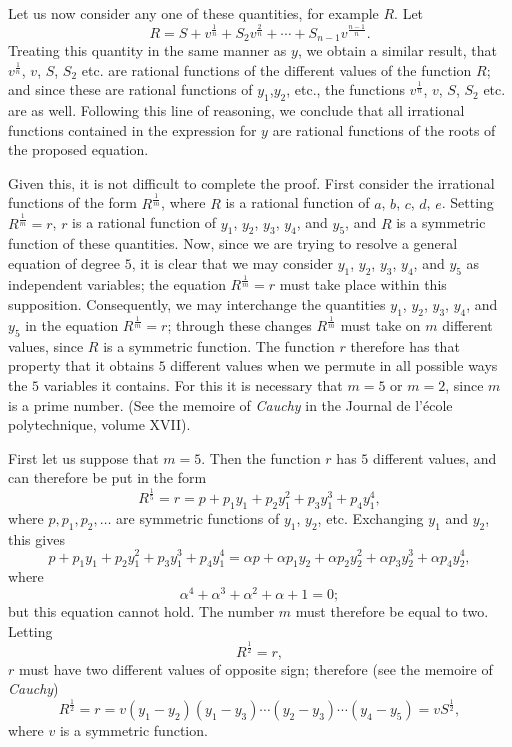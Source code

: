 \documentclass[12pt]{article}
\begin{document}
Let us now consider any one of these quantities, for example $R$.   Let
\[ R = S + v^{\frac{1}{n}} + S_2 v^{\frac{2}{n}} + \cdots + S_{n-1} v^{\frac{n-1}{n}}. \]
Treating this quantity in the same manner as $y$, we obtain a similar result, that $v^{ \frac{1}{n} }$, $v$, $S$, $S_2$ etc. are rational functions of the different values of the function $R$; and since these are rational functions of $y_1$,$y_2$, etc., the functions $v^{\frac{1}{n}}$, $v$, $S$, $S_2$ etc. are as well.  Following this line of reasoning, we conclude that all irrational functions contained in the expression for $y$ are rational functions of the roots of the proposed equation. 

Given this, it is not difficult to complete the proof.  First consider the irrational functions of the form $R^{\frac{1}{m}}$, where $R$ is a rational function of $a$, $b$, $c$, $d$, $e$.  Setting $R^{\frac{1}{m}} = r$, $r$ is a rational function of $y_1$, $y_2$, $y_3$, $y_4$, and $y_5$, and $R$ is a symmetric function of these quantities.  Now, since we are trying to resolve a general equation of degree $5$, it is clear that we may consider $y_1$, $y_2$, $y_3$, $y_4$, and $y_5$ as independent variables; the equation $R^{\frac{1}{m}} = r$ must take place within this supposition.  Consequently, we may interchange the quantities $y_1$, $y_2$, $y_3$, $y_4$, and $y_5$ in the equation $R^{\frac{1}{m}} = r$; through these changes $R^{\frac{1}{m}}$ must take on $m$ different values, since $R$ is a symmetric function.  The function $r$ therefore has that property that it obtains $5$ different values when we permute in all possible ways the $5$ variables it contains.  For this it is necessary that $m= 5$ or $m =2$, since $m$ is a prime number. (See the memoire of \emph{Cauchy} in the Journal de l'\'ecole polytechnique, volume XVII).  

First let us suppose that $m = 5$.  Then the function $r$ has $5$ different values, and can therefore be put in the form
\[ R^{\frac{1}{5}} = r = p + p_1y_1 + p_2 y_1^2 + p_3y_1^3 + p_4 y_1^4, \]
where $p, p_1, p_2, \dots$ are symmetric functions of $y_1$, $y_2$, etc.  Exchanging $y_1$ and $y_2$, this gives
\[ p + p_1 y_1 + p_2y_1^2 + p_3y_1^3 + p_4 y_1^4 = \alpha p + \alpha p_1 y_2 + \alpha p_2y_2^2 + \alpha p_3y_2^3 + \alpha p_4 y_2^4, \]
where 
\[ \alpha^4 + \alpha^3 + \alpha^2 + \alpha + 1 = 0 ; \]
but this equation cannot hold.  The number $m$ must therefore be equal to two.  Letting 
\[ R^{\frac{1}{2}} = r, \]
$r$ must have two different values of opposite sign; therefore (see the memoire of \emph{Cauchy}) 
\[ R^{\frac{1}{2}} = r = v(y_1 - y_2)(y_1 - y_3) \cdots (y_2 - y_3) \cdots (y_4 - y_5) = vS^{\frac{1}{2}}, \]
where $v$ is a symmetric function.  
\end{document}
